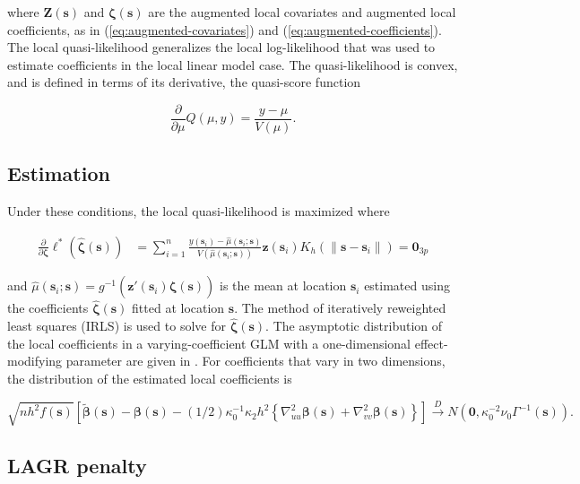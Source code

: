 \documentclass[authoryear,review, 12pt]{elsarticle}
\begin{document}
where $\bm{Z}\left(\bm{s}\right)$ and $\bm{\zeta}\left(\bm{s}\right)$
are the augmented local covariates and augmented local coefficients,
as in (\ref{eq:augmented-covariates}) and (\ref{eq:augmented-coefficients}).
The local quasi-likelihood generalizes the local log-likelihood that
was used to estimate coefficients in the local linear model case.
The quasi-likelihood is convex, and is defined in terms of its derivative,
the quasi-score function

\[
\frac{\partial}{\partial\mu}Q\left(\mu,y\right)=\frac{y-\mu}{V\left(\mu\right)}.
\]



\subsection{Estimation}

Under these conditions, the local quasi-likelihood is maximized where

\begin{align}
\frac{\partial}{\partial\bm{\zeta}}\mathcal{\ell}^{*}\left(\hat{\bm{\zeta}}\left(\bm{s}\right)\right) & =\sum_{i=1}^{n}\frac{y\left(\bm{s}_{i}\right)-\hat{\mu}\left(\bm{s}_{i};\bm{s}\right)}{V\left(\hat{\mu}\left(\bm{s}_{i};\bm{s}\right)\right)}\bm{z}\left(\bm{s}_{i}\right)K_{h}\left(\|\bm{s}-\bm{s}_{i}\|\right)=\bm{0}_{3p}
\end{align}


and $\hat{\mu}\left(\bm{s}_{i};\bm{s}\right)=g^{-1}\left(\bm{z}'\left(\bm{s}_{i}\right)\hat{\bm{\zeta}}\left(\bm{s}\right)\right)$
is the mean at location $\bm{s}_{i}$ estimated using the coefficients
$\hat{\bm{\zeta}}\left(\bm{s}\right)$ fitted at location $\bm{s}$.
The method of iteratively reweighted least squares (IRLS) is used
to solve for $\hat{\bm{\zeta}}\left(\bm{s}\right)$. The asymptotic
distribution of the local coefficients in a varying-coefficient GLM
with a one-dimensional effect-modifying parameter are given in \citet{Cai-Fan-Li-2000}.
For coefficients that vary in two dimensions, the distribution of
the estimated local coefficients is

\[
\sqrt{{nh^{2}f(\bm{{s}})}}\left[\tilde{\bm{\beta}}(\bm{s})-\bm{\beta}(\bm{s})-(1/2)\kappa_{0}^{-1}\kappa_{2}h^{2}\left\{ \nabla_{uu}^{2}\bm{\beta}(\bm{s})+\nabla_{vv}^{2}\bm{\beta}(\bm{s})\right\} \right]\xrightarrow{{D}}N\left(\bm{0},\kappa_{0}^{-2}\nu_{0}\Gamma^{-1}(\bm{s})\right).
\]



\subsection{LAGR penalty}
\end{document}
